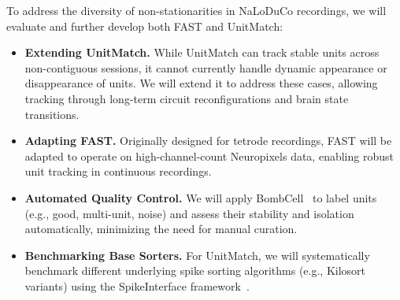 To address the diversity of non-stationarities in NaLoDuCo recordings, we will
evaluate and further develop both FAST and UnitMatch:

\begin{itemize}

	\item \textbf{Extending UnitMatch.} While UnitMatch can track stable units
across non-contiguous sessions, it cannot currently handle dynamic appearance
or disappearance of units. We will extend it to address these cases, allowing
tracking through long-term circuit reconfigurations and brain state
transitions.

	\item \textbf{Adapting FAST.} Originally designed for tetrode recordings,
FAST will be adapted to operate on high-channel-count Neuropixels data,
enabling robust unit tracking in continuous recordings.

	\item \textbf{Automated Quality Control.} We will apply
BombCell~\citep{fabreEtAl23} to label units (e.g., good, multi-unit, noise) and
assess their stability and isolation automatically, minimizing the need for
manual curation.

	\item \textbf{Benchmarking Base Sorters.} For UnitMatch, we will
systematically benchmark different underlying spike sorting algorithms (e.g.,
Kilosort variants) using the SpikeInterface framework~\citep{buccinoEtAl20}.

\end{itemize}

